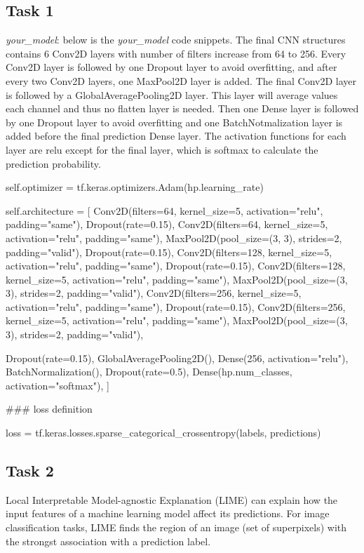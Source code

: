 \subsection*{Task 1}
\emph{your\_model}: below is the \textit{your\_model} code snippets. The final CNN structures contains 6 Conv2D layers with number of filters increase from 64 to 256. Every Conv2D layer is followed by one Dropout layer to avoid overfitting, and after every two Conv2D layers, one MaxPool2D layer is added. The final Conv2D layer is followed by a GlobalAveragePooling2D layer. This layer will average values each channel and thus no flatten layer is needed. Then one Dense layer is followed by one Dropout layer to avoid overfitting and one BatchNotmalization layer is added before the final prediction Dense layer.  The activation functions for each layer are relu except for the final layer, which is softmax to calculate the prediction probability.
\begin{python}
self.optimizer = tf.keras.optimizers.Adam(hp.learning_rate)

self.architecture = [
              Conv2D(filters=64, kernel_size=5, activation="relu", padding="same"),
              Dropout(rate=0.15),
              Conv2D(filters=64, kernel_size=5, activation="relu", padding="same"),
              MaxPool2D(pool_size=(3, 3), strides=2, padding="valid"),
              Dropout(rate=0.15),
              Conv2D(filters=128, kernel_size=5, activation="relu", padding="same"),
              Dropout(rate=0.15),
              Conv2D(filters=128, kernel_size=5, activation="relu", padding="same"),
              MaxPool2D(pool_size=(3, 3), strides=2, padding="valid"),
              Conv2D(filters=256, kernel_size=5, activation="relu", padding="same"),
              Dropout(rate=0.15),
              Conv2D(filters=256, kernel_size=5, activation="relu", padding="same"),
              MaxPool2D(pool_size=(3, 3), strides=2, padding="valid"),

              Dropout(rate=0.15),
              GlobalAveragePooling2D(),
              Dense(256, activation="relu"),
              BatchNormalization(),
              Dropout(rate=0.5),
              Dense(hp.num_classes, activation="softmax"),
       ]

### loss definition

loss = tf.keras.losses.sparse_categorical_crossentropy(labels, predictions)
\end{python}

\subsection*{Task 2}
Local Interpretable Model-agnostic Explanation (LIME) can explain how the input features of a machine learning model affect its predictions. For image classification tasks, LIME finds the region of an image (set of superpixels) with the strongst association with a prediction label.


